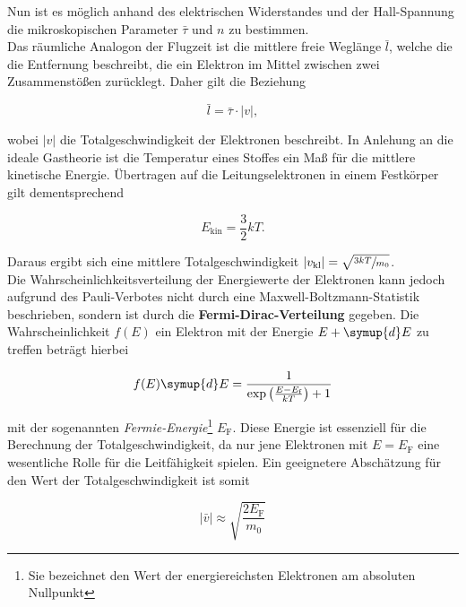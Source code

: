 \noindent Nun ist es möglich anhand des elektrischen Widerstandes und der Hall-Spannung die 
mikroskopischen Parameter $\bar{\tau}$ und $n$ zu bestimmen.\\

\noindent Das räumliche Analogon der Flugzeit ist die mittlere freie Weglänge $\bar{l}$, welche die 
die Entfernung beschreibt, die ein Elektron im Mittel zwischen zwei Zusammenstößen zurücklegt.
Daher gilt die Beziehung

\begin{equation}
\label{eqn:Weglaenge}
    \bar{l} = \bar{\tau}\cdot|v|,
\end{equation}

\noindent wobei $|v|$ die Totalgeschwindigkeit der Elektronen beschreibt. In Anlehung an die ideale 
Gastheorie ist die Temperatur eines Stoffes ein Maß für die mittlere kinetische Energie. Übertragen auf die 
Leitungselektronen in einem Festkörper gilt dementsprechend

\begin{equation*}
    E_\text{kin} = \frac{3}{2}kT.
\end{equation*}

\noindent Daraus ergibt sich eine mittlere Totalgeschwindigkeit $|v_\text{kl}| = \sqrt{\sfrac{3kT}{m_0}}$.\\

\noindent Die Wahrscheinlichkeitsverteilung der Energiewerte der Elektronen kann jedoch aufgrund des Pauli-Verbotes
nicht durch eine Maxwell-Boltzmann-Statistik beschrieben, sondern ist durch die \textbf{Fermi-Dirac-Verteilung} 
gegeben. Die Wahrscheinlichkeit $f(E)$ ein Elektron mit der Energie $E + \symup{d}E$ zu treffen 
beträgt hierbei 

\begin{equation*}
    f(E)\symup{d}E = \frac{1}{\exp{\left(\frac{E-E_\text{f}}{kT}\right)}+1}
\end{equation*}

\noindent mit der sogenannten \emph{Fermie-Energie}\footnote{Sie bezeichnet den Wert der energiereichsten Elektronen
am absoluten Nullpunkt} $E_\text{F}$. Diese Energie ist essenziell für die Berechnung der Totalgeschwindigkeit, da nur jene 
Elektronen mit $E = E_\text{F}$ eine wesentliche Rolle für die Leitfähigkeit spielen. Ein geeignetere Abschätzung für 
den Wert der Totalgeschwindigkeit ist somit 

\begin{equation*}
    |\bar{v}| \approx \sqrt{\frac{2E_\text{F}}{m_0}}
\end{equation*}

